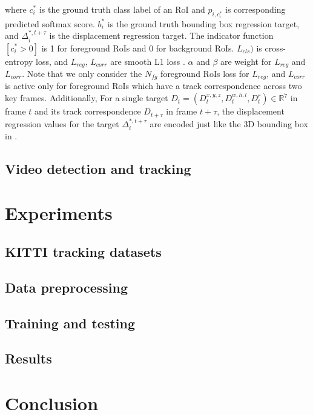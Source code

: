 \documentclass{bmvc2k}
\begin{document}
where $c^*_i$ is the ground truth class label of an RoI and $p_{i, c^*_i}$ is corresponding predicted softmax score. $b^*_i$ is the ground truth bounding box regression target, and $\Delta^{*, t+\tau}_i$ is the displacement regression target. The indicator function $ [c^*_i > 0]$ is 1 for foreground RoIs and 0 for background RoIs. $L_{cls})$ is cross-entropy loss, and $L_{reg}$, $L_{corr}$ are smooth L1 loss \cite{girshick2015fast}. $\alpha$ and $\beta$ are weight for $L_{reg}$ and $L_{corr}$. Note that we only consider the $N_{fg}$ foreground RoIs loss for $L_{reg}$, and $L_{corr}$ is active only for foreground RoIs which have a track correspondence across two key frames. Additionally, For a single target $D_t = (D^{x,y,z}_t, D^{w,h,l}_t, D^r_t) \in \mathbb{R}^7$ in frame $t$ and its track correspondence $D_{t+\tau}$ in frame $t+\tau$, the displacement regression values for the target $ \Delta^{*, t+\tau}_i$ are encoded just like the 3D bounding box in \cite{ku2018joint}.

\subsection{Video detection and tracking}


\section{Experiments}
\label{sec:experiments}

\subsection{KITTI tracking datasets}


\subsection{Data preprocessing}


\subsection{Training and testing}

\subsection{Results}

\section{Conclusion}
\label{sec:conclusion}



\end{document}
